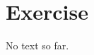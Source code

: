 \documentclass[12pt,a4paper]{scrartcl}
\begin{document}
\section*{Exercise \theexnum{}}


No text so far.

\noimg
\end{document}
